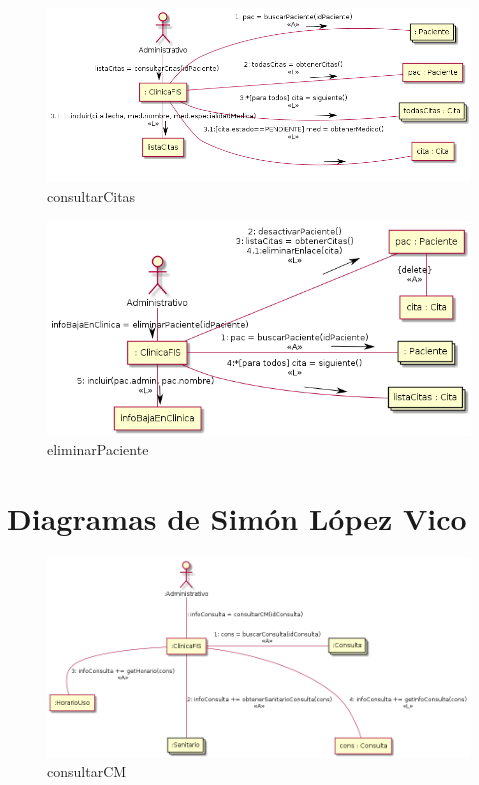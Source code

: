 \documentclass[11pt,a4paper]{article}
\begin{document}
\begin{figure}[H]
	\caption{consultarCitas}
	\centering
	\includegraphics[width=\textwidth,height=\textheight,keepaspectratio]{Diagramas/consultarCitas}
\end{figure}

\begin{figure}[H]
	\caption{eliminarPaciente}
	\centering
	\includegraphics[width=\textwidth,height=\textheight,keepaspectratio]{Diagramas/eliminarPaciente}
\end{figure}

\section{Diagramas de Simón López Vico}

\begin{figure}[H]
	\caption{consultarCM}
	\centering
	\includegraphics[width=\textwidth,height=\textheight,keepaspectratio]{Diagramas/consultarCM}
\end{figure}
\end{document}
